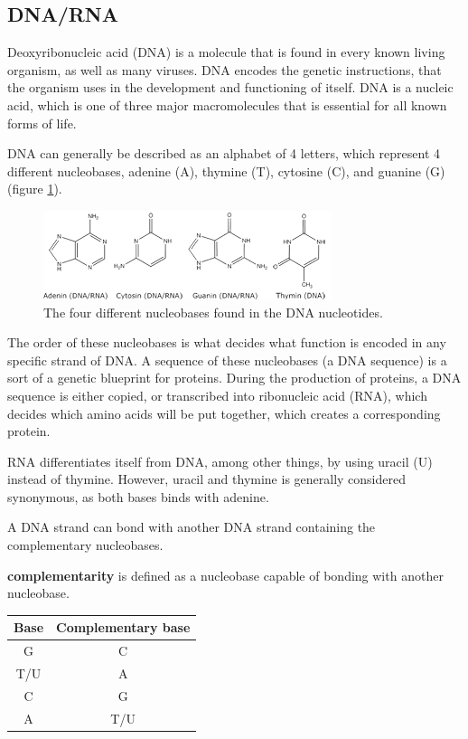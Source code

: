 \documentclass[12pt]{article}
\theoremstyle{definition}
\begin{document}
\subsection{DNA/RNA}

Deoxyribonucleic acid (DNA) is a molecule that is found in every known living organism, as well as many viruses. DNA encodes the genetic instructions, that the organism uses in the development and functioning of itself. DNA is a nucleic acid, which is one of three major macromolecules that is essential for all known forms of life.

DNA can generally be described as an alphabet of 4 letters, which represent 4 different nucleobases, adenine (A), thymine (T), cytosine (C), and guanine (G) (figure \ref{dnabases}).

\begin{figure}[H]
\label{dnabases}
\begin{center}
	\includegraphics[scale=4]{dnabaserne.png}
\end{center}
\caption{The four different nucleobases found in the DNA nucleotides.\cite{DNA-biotechacademy}}
\end{figure}

The order of these nucleobases is what decides what function is encoded in any specific strand of DNA. A sequence of these nucleobases (a DNA sequence) is a sort of a genetic blueprint for proteins. During the production of proteins, a DNA sequence is either copied, or transcribed into ribonucleic acid (RNA), which decides which amino acids will be put together, which creates a corresponding protein.

RNA differentiates itself from DNA, among other things, by using uracil (U) instead of thymine. However, uracil and thymine is generally considered synonymous, as both bases binds with adenine.

A DNA strand can bond with another DNA strand containing the complementary nucleobases.

\begin{definition}
\textbf{complementarity} is defined as a nucleobase capable of bonding with another nucleobase.
\begin{center}
\begin{tabular}{|c|c|}
\hline
Base & Complementary base \\
\hline
G & C \\
T/U & A \\
C & G \\
A & T/U \\
\hline
\end{tabular}
\end{center}
\end{definition}
\end{document}
